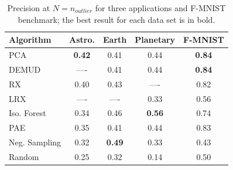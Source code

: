 \documentclass[letterpaper]{article} %
\begin{document}
\begin{table}
  \caption{Precision at $N=n_{outlier}$ for three applications and F-MNIST
   benchmark; the best result for each data set is in bold.}
  \label{tab:faw_results}
  \centering
  \begin{tabular}{l|cccc}
    \hline
    Algorithm & Astro. & Earth & Planetary & F-MNIST \\
    \hline
    PCA               & \textbf{0.42} & 0.41 & 0.44 & \textbf{0.84} \\
    DEMUD             & ---- & 0.41 & 0.44 & \textbf{0.84} \\
    \hline
    RX                & 0.40 & 0.43 & ---- & 0.82 \\
    LRX               & ----& ---- & 0.33 & 0.56 \\
    \hline
    Iso. Forest  & 0.34 & 0.46 & \textbf{0.56} & 0.74 \\
    \hline
    PAE               & 0.35 & 0.41 & 0.44 & 0.83 \\
    Neg. Sampling & 0.32 & \textbf{0.49} & 0.33 & 0.43 \\
    \hline
    Random            & 0.25 & 0.32 & 0.14 & 0.50 \\
    \hline
  \end{tabular}
\end{table}
\end{document}
